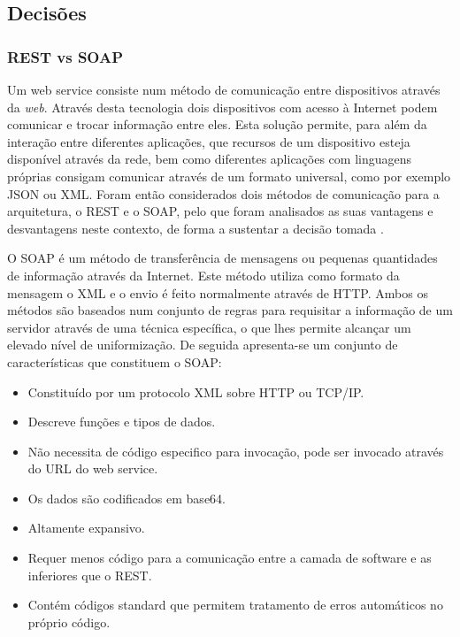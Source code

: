 \subsection{Decisões}


\subsubsection{REST vs SOAP}
Um web service consiste num método de comunicação entre dispositivos através da \textit{web}. Através desta tecnologia dois dispositivos com acesso à Internet podem comunicar e trocar informação entre eles. Esta solução permite, para além da interação entre diferentes aplicações, que recursos de um dispositivo esteja disponível através da rede, bem como diferentes aplicações com linguagens próprias consigam comunicar através de um formato universal, como por exemplo JSON ou XML. Foram então considerados dois métodos de comunicação para a arquitetura, o REST e o SOAP, pelo que foram analisados as suas vantagens e desvantagens neste contexto, de forma a sustentar a decisão tomada \cite{mulligan2009comparison}.

O SOAP é um método de transferência de mensagens ou pequenas quantidades de informação através da Internet. Este método utiliza como formato da mensagem o XML e o envio é feito normalmente através de HTTP. Ambos os métodos são baseados num conjunto de regras para requisitar a informação de um servidor através de uma técnica específica, o que lhes permite alcançar um elevado nível de uniformização. De seguida apresenta-se um conjunto de características que constituem o SOAP:
\begin{itemize}
	\item Constituído por um protocolo XML sobre HTTP ou TCP/IP.
	\item Descreve funções e tipos de dados.
	\item Não necessita de código especifico para invocação, pode ser invocado através do URL do web service.
	\item Os dados são codificados em base64.
	\item Altamente expansivo.
	\item Requer menos código para a comunicação entre a camada de software e as inferiores que o REST.
	\item Contém códigos standard que permitem tratamento de erros automáticos no próprio código.
\end{itemize}

